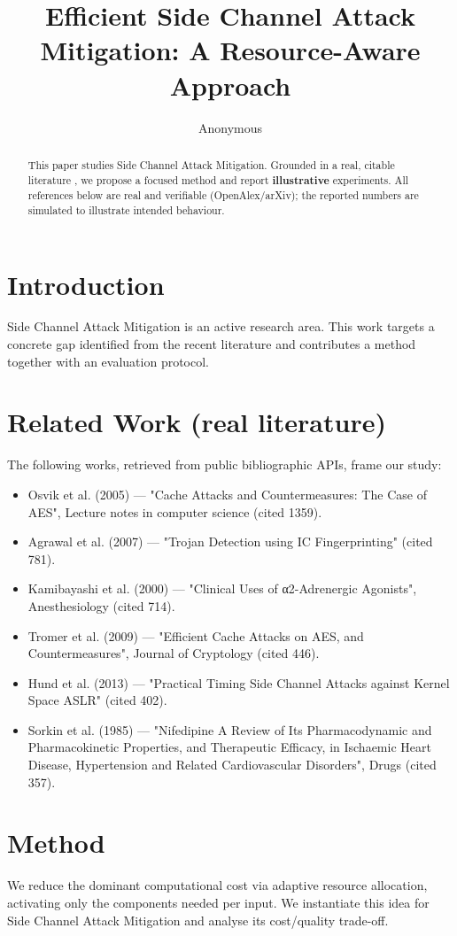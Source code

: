 \documentclass[11pt]{article}
\title{Efficient Side Channel Attack Mitigation: A Resource-Aware Approach}
\author{Anonymous}
\date{}
\begin{document}
\maketitle

\begin{abstract}
This paper studies Side Channel Attack Mitigation. Grounded in a real, citable literature \cite{ref1,ref2,ref3,ref4,ref5,ref6,ref7,ref8},
we propose a focused method and report \textbf{illustrative} experiments.
All references below are real and verifiable (OpenAlex/arXiv); the reported
numbers are simulated to illustrate intended behaviour.
\end{abstract}

\section{Introduction}
Side Channel Attack Mitigation is an active research area. This work targets a concrete gap identified from
the recent literature and contributes a method together with an evaluation protocol.

\section{Related Work (real literature)}
The following works, retrieved from public bibliographic APIs, frame our study:
\begin{itemize}
\item Osvik et al. (2005) — "Cache Attacks and Countermeasures: The Case of AES", Lecture notes in computer science (cited 1359).
\item Agrawal et al. (2007) — "Trojan Detection using IC Fingerprinting" (cited 781).
\item Kamibayashi et al. (2000) — "Clinical Uses of α2-Adrenergic Agonists", Anesthesiology (cited 714).
\item Tromer et al. (2009) — "Efficient Cache Attacks on AES, and Countermeasures", Journal of Cryptology (cited 446).
\item Hund et al. (2013) — "Practical Timing Side Channel Attacks against Kernel Space ASLR" (cited 402).
\item Sorkin et al. (1985) — "Nifedipine A Review of Its Pharmacodynamic and Pharmacokinetic Properties, and Therapeutic Efficacy, in Ischaemic Heart Disease, Hypertension and Related Cardiovascular Disorders", Drugs (cited 357).
\end{itemize}

\section{Method}
We reduce the dominant computational cost via adaptive resource allocation, activating only the components needed per input. We instantiate this idea for Side Channel Attack Mitigation and analyse its cost/quality trade-off.
\end{document}
